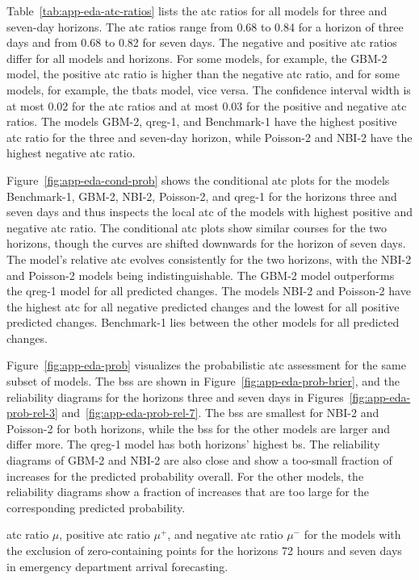 \documentclass[pdflatex]{sn-jnl}
\theoremstyle{plain}%
\theoremstyle{definition}
\newcommand{\acc}{\mu}
\newcommand{\accp}{\acc^+}
\newcommand{\accm}{\acc^-}
\begin{document}
Table~\ref{tab:app-eda-atc-ratios} lists the \ac{atc} ratios for all models for three and seven-day horizons.
The \ac{atc} ratios range from 0.68 to 0.84 for a horizon of three days and from 0.68 to 0.82 for seven days.
The negative and positive \ac{atc} ratios differ for all models and horizons.
For some models, for example, the GBM-2 model, the positive \ac{atc} ratio is higher than the negative \ac{atc} ratio, and for some models, for example, the tbats model, vice versa.
The confidence interval width is at most 0.02 for the \ac{atc} ratios and at most 0.03 for the positive and negative \ac{atc} ratios.
The models GBM-2, qreg-1, and Benchmark-1 have the highest positive \ac{atc} ratio for the three and seven-day horizon, while Poisson-2 and NBI-2 have the highest negative \ac{atc} ratio.

Figure~\ref{fig:app-eda-cond-prob} shows the conditional \ac{atc} plots for the models Benchmark-1, GBM-2, NBI-2, Poisson-2, and qreg-1 for the horizons three and seven days and thus inspects the local \ac{atc} of the models with highest positive and negative \ac{atc} ratio.
The conditional \ac{atc} plots show similar courses for the two horizons, though the curves are shifted downwards for the horizon of seven days.
The model's relative \ac{atc} evolves consistently for the two horizons, with the NBI-2 and Poisson-2 models being indistinguishable.
The GBM-2 model outperforms the qreg-1 model for all predicted changes.
The models NBI-2 and Poisson-2 have the highest \ac{atc} for all negative predicted changes and the lowest for all positive predicted changes.
Benchmark-1 lies between the other models for all predicted changes.

Figure~\ref{fig:app-eda-prob} visualizes the probabilistic \ac{atc} assessment for the same subset of models.
The \acfp{bs} are shown in Figure~\ref{fig:app-eda-prob-brier}, and the reliability diagrams for the horizons three and seven days in Figures~\ref{fig:app-eda-prob-rel-3} and~\ref{fig:app-eda-prob-rel-7}.
The \acp{bs} are smallest for NBI-2 and Poisson-2 for both horizons, while the \acp{bs} for the other models are larger and differ more.
The qreg-1 model has both horizons' highest \ac{bs}.
The reliability diagrams of GBM-2 and NBI-2 are also close and show a too-small fraction of increases for the predicted probability overall.
For the other models, the reliability diagrams show a fraction of increases that are too large for the corresponding predicted probability.

\begin{table}
    \centering
    \tiny
    
    \caption[ATC ratios for the emergency department arrival forecasts.]{\Ac{atc} ratio $\acc$, positive \ac{atc} ratio $\accp$, and negative \ac{atc} ratio $\accm$ for the models with the exclusion of zero-containing points for the horizons 72 hours and seven days in emergency department arrival forecasting.}
    \label{tab:app-eda-atc-ratios}
\end{table}
\end{document}
